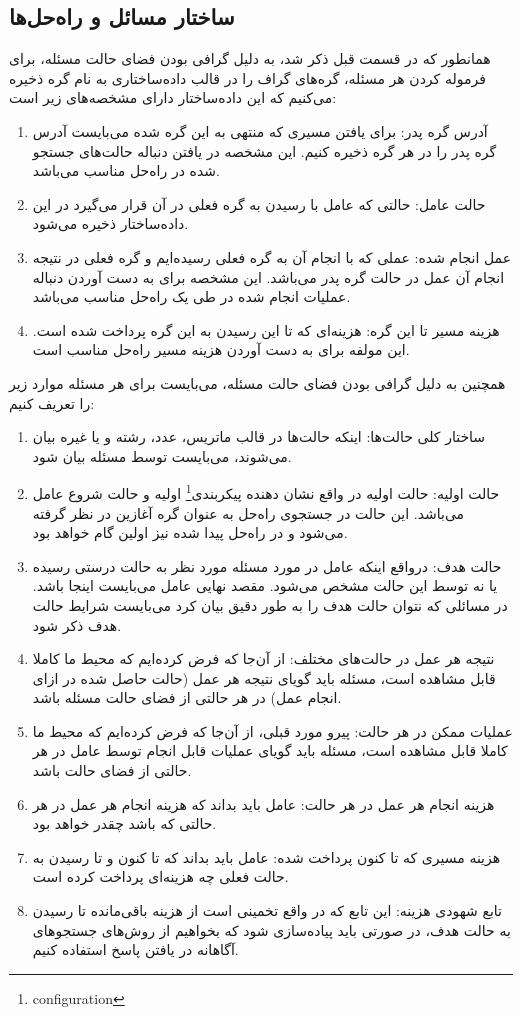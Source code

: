 	\subsection{ساختار مسائل و راه‌حل‌ها}
	همانطور که در قسمت قبل ذکر شد، به دلیل گرافی بودن فضای حالت مسئله، برای فرموله کردن هر مسئله، گره‌های گراف را در قالب داده‌ساختاری به نام گره ذخیره می‌کنیم که این داده‌ساختار دارای مشخصه‌های زیر است:
	\begin{enumerate}
		\item
		آدرس گره پدر:
		برای یافتن مسیری که منتهی به این گره شده می‌بایست آدرس گره پدر را در هر گره ذخیره کنیم. این مشخصه در یافتن دنباله حالت‌های جستجو شده در راه‌حل مناسب می‌باشد.
		\item
		حالت عامل:
		حالتی که عامل با رسیدن به گره فعلی در آن قرار می‌گیرد در این داده‌ساختار ذخیره می‌شود.
		\item
		عمل انجام شده:
		عملی که با انجام آن به گره فعلی رسیده‌ایم و گره فعلی در نتیجه انجام آن عمل در حالت گره پدر می‌باشد. این مشخصه برای به دست آوردن دنباله عملیات انجام شده در طی یک راه‌حل مناسب می‌باشد.
		\item
		هزینه مسیر تا این گره:
		هزینه‌ای که تا این رسیدن به این گره پرداخت شده است. این مولفه برای به دست آوردن هزینه مسیر راه‌حل مناسب است.
	\end{enumerate}
	 همچنین به دلیل گرافی بودن فضای حالت مسئله، می‌بایست برای هر مسئله موارد زیر را تعریف کنیم:
	\begin{enumerate}
		\item
		ساختار کلی حالت‌ها:
		اینکه حالت‌ها در قالب ماتریس، عدد، رشته و یا غیره بیان می‌شوند، می‌بایست توسط مسئله بیان شود.
		\item
		حالت اولیه:
		حالت اولیه در واقع نشان دهنده پیکربندی\footnote{configuration} اولیه و حالت شروع عامل می‌باشد. این حالت در جستجوی راه‌حل به عنوان گره آغازین در نظر گرفته می‌شود و در راه‌حل پیدا شده نیز اولین گام خواهد بود.
		\item
		حالت هدف:
		درواقع اینکه عامل در مورد مسئله مورد نظر به حالت درستی رسیده یا نه توسط این حالت مشخص می‌شود. مقصد نهایی عامل می‌بایست اینجا باشد. در مسائلی که نتوان حالت هدف را به طور دقیق بیان کرد می‌بایست شرایط حالت هدف ذکر شود.
		\item
		نتیجه هر عمل در حالت‌های مختلف:
		از آن‌جا که فرض کرده‌ایم که محیط ما کاملا قابل مشاهده است، مسئله باید گویای نتیجه هر عمل (حالت حاصل شده در ازای انجام عمل) در هر حالتی از فضای حالت مسئله باشد.
		\item
		عملیات ممکن در هر حالت:
		پیرو مورد قبلی، از آن‌جا که فرض کرده‌ایم که محیط ما کاملا قابل مشاهده است، مسئله باید گویای عملیات قابل انجام توسط عامل در هر حالتی از فضای حالت باشد.
		\item
		هزینه انجام هر عمل در هر حالت:
		عامل باید بداند که هزینه انجام هر عمل در هر حالتی که باشد چقدر خواهد بود.
		\item
		هزینه مسیری که تا کنون پرداخت شده:
		عامل باید بداند که تا کنون و تا رسیدن به حالت فعلی چه هزینه‌ای پرداخت کرده است.
		\item
		تابع شهودی هزینه:
		این تابع که در واقع تخمینی است از هزینه باقی‌مانده تا رسیدن به حالت هدف، در صورتی باید پیاده‌سازی شود که بخواهیم از روش‌های جستجوهای آگاهانه در یافتن پاسخ استفاده کنیم.
	\end{enumerate}
